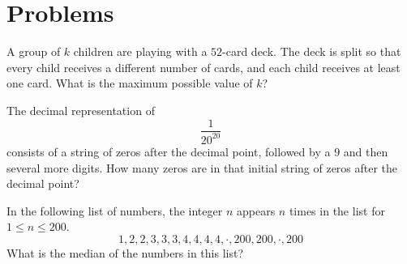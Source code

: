 \documentclass{article}
\begin{document}
\pagebreak

\section{Problems}

\minpt{}

\psetquote{}{}

\begin{prob}[CMC 10B 2020/4]{2}
A group of $k$ children are playing with a $52$-card deck.  The deck is split so that every child receives a different number of cards, and each child receives at least one card. What is the maximum possible value of $k$?
\end{prob}

\begin{req}[AMC 10B 2020/12]{3}
The decimal representation of \[\frac{1}{20^{20}}\] consists of a string of zeros after the decimal point, followed by a $9$ and then several more digits. How many zeros are in that initial string of zeros after the decimal point?

\end{req}

\begin{prob}[AMC 10A 2021/16]{4}
In the following list of numbers, the integer $n$ appears $n$ times in the list for $1 \leq n \leq 200$.
$$1, 2, 2, 3, 3, 3, 4, 4, 4, 4, \cdot, 200, 200, \cdot , 200$$What is the median of the numbers in this list?

\end{prob}
\end{document}
